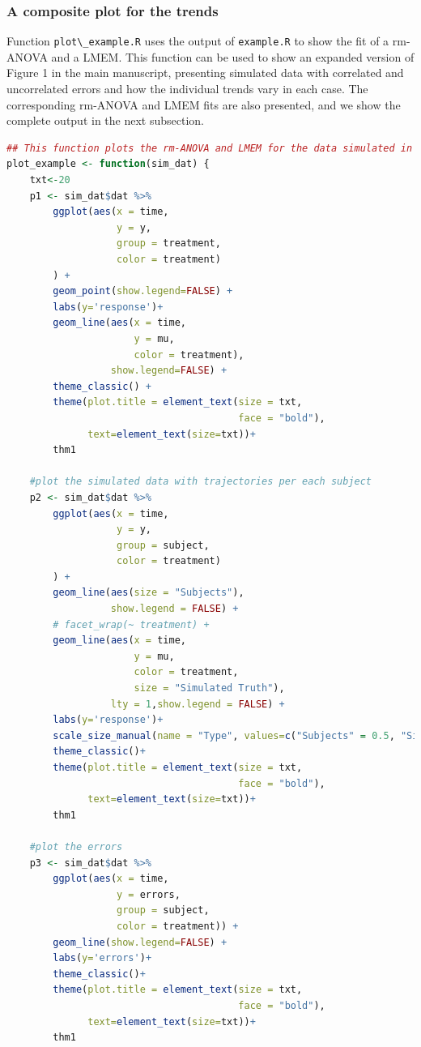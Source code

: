 \documentclass[
]{article}
\newcommand{\passthrough}[1]{#1}
\begin{document}
\hypertarget{a-composite-plot-for-the-trends}{%
\subsubsection{A composite plot for the trends}\label{a-composite-plot-for-the-trends}}

Function \passthrough{\lstinline!plot\_example.R!} uses the output of \passthrough{\lstinline!example.R!} to show the fit of a rm-ANOVA and a LMEM. This function can be used to show an expanded version of Figure 1 in the main manuscript, presenting simulated data with correlated and uncorrelated errors and how the individual trends vary in each case. The corresponding rm-ANOVA and LMEM fits are also presented, and we show the complete output in the next subsection.

\begin{lstlisting}[language=R]
## This function plots the rm-ANOVA and LMEM for the data simulated in example.R
plot_example <- function(sim_dat) {
    txt<-20
    p1 <- sim_dat$dat %>%
        ggplot(aes(x = time,
                   y = y,
                   group = treatment,
                   color = treatment)
        ) +
        geom_point(show.legend=FALSE) +
        labs(y='response')+
        geom_line(aes(x = time,
                      y = mu,
                      color = treatment),
                  show.legend=FALSE) +
        theme_classic() +
        theme(plot.title = element_text(size = txt,
                                        face = "bold"),
              text=element_text(size=txt))+
        thm1

    #plot the simulated data with trajectories per each subject
    p2 <- sim_dat$dat %>%
        ggplot(aes(x = time,
                   y = y,
                   group = subject,
                   color = treatment)
        ) +
        geom_line(aes(size = "Subjects"),
                  show.legend = FALSE) +
        # facet_wrap(~ treatment) +
        geom_line(aes(x = time,
                      y = mu,
                      color = treatment,
                      size = "Simulated Truth"),
                  lty = 1,show.legend = FALSE) +
        labs(y='response')+
        scale_size_manual(name = "Type", values=c("Subjects" = 0.5, "Simulated Truth" = 3)) +
        theme_classic()+
        theme(plot.title = element_text(size = txt,
                                        face = "bold"),
              text=element_text(size=txt))+
        thm1

    #plot the errors
    p3 <- sim_dat$dat %>%
        ggplot(aes(x = time,
                   y = errors,
                   group = subject,
                   color = treatment)) +
        geom_line(show.legend=FALSE) +
        labs(y='errors')+
        theme_classic()+
        theme(plot.title = element_text(size = txt,
                                        face = "bold"),
              text=element_text(size=txt))+
        thm1


\end{lstlisting}
\end{document}
